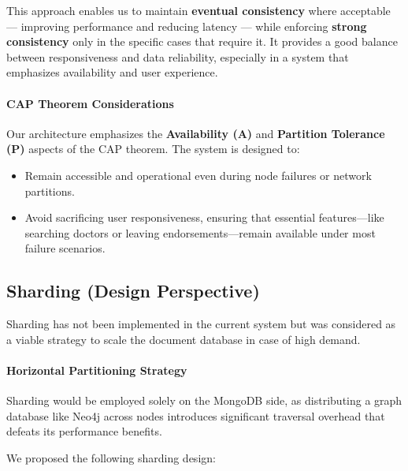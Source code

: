 This approach enables us to maintain \textbf{eventual consistency} where acceptable — improving performance and reducing latency — while enforcing \textbf{strong consistency} only in the specific cases that require it. It provides a good balance between responsiveness and data reliability, especially in a system that emphasizes availability and user experience.

\paragraph{CAP Theorem Considerations}

Our architecture emphasizes the \textbf{Availability (A)} and \textbf{Partition Tolerance (P)} aspects of the CAP theorem. The system is designed to:
\begin{itemize}
  \item Remain accessible and operational even during node failures or network partitions.
  \item Avoid sacrificing user responsiveness, ensuring that essential features—like searching doctors or leaving endorsements—remain available under most failure scenarios.
\end{itemize}

\subsection{Sharding (Design Perspective)}

Sharding has not been implemented in the current system but was considered as a viable strategy to scale the document database in case of high demand.

\paragraph{Horizontal Partitioning Strategy}

Sharding would be employed solely on the MongoDB side, as distributing a graph database like Neo4j across nodes introduces significant traversal overhead that defeats its performance benefits.

We proposed the following sharding design:

